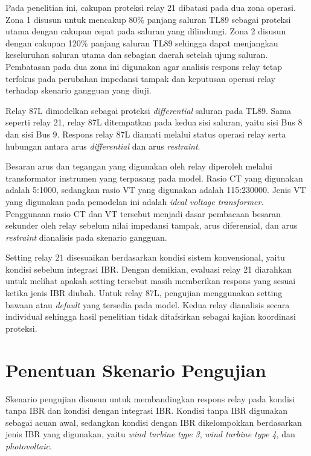Pada penelitian ini, cakupan proteksi relay 21 dibatasi pada dua zona operasi. Zona 1 disusun untuk mencakup 80\% panjang saluran TL89 sebagai proteksi utama dengan cakupan cepat pada saluran yang dilindungi. Zona 2 disusun dengan cakupan 120\% panjang saluran TL89 sehingga dapat menjangkau keseluruhan saluran utama dan sebagian daerah setelah ujung saluran. Pembatasan pada dua zona ini digunakan agar analisis respons relay tetap terfokus pada perubahan impedansi tampak dan keputusan operasi relay terhadap skenario gangguan yang diuji.

Relay 87L dimodelkan sebagai proteksi \textit{differential} saluran pada TL89. Sama seperti relay 21, relay 87L ditempatkan pada kedua sisi saluran, yaitu sisi Bus 8 dan sisi Bus 9. Respons relay 87L diamati melalui status operasi relay serta hubungan antara arus \textit{differential} dan arus \textit{restraint}.

Besaran arus dan tegangan yang digunakan oleh relay diperoleh melalui transformator instrumen yang terpasang pada model. Rasio CT yang digunakan adalah 5:1000, sedangkan rasio VT yang digunakan adalah 115:230000. Jenis VT yang digunakan pada pemodelan ini adalah \textit{ideal voltage transformer}. Penggunaan rasio CT dan VT tersebut menjadi dasar pembacaan besaran sekunder oleh relay sebelum nilai impedansi tampak, arus diferensial, dan arus \textit{restraint} dianalisis pada skenario gangguan.

Setting relay 21 disesuaikan berdasarkan kondisi sistem konvensional, yaitu kondisi sebelum integrasi IBR. Dengan demikian, evaluasi relay 21 diarahkan untuk melihat apakah setting tersebut masih memberikan respons yang sesuai ketika jenis IBR diubah. Untuk relay 87L, pengujian menggunakan setting bawaan atau \textit{default} yang tersedia pada model. Kedua relay dianalisis secara individual sehingga hasil penelitian tidak ditafsirkan sebagai kajian koordinasi proteksi.

\section{Penentuan Skenario Pengujian}

Skenario pengujian disusun untuk membandingkan respons relay pada kondisi tanpa IBR dan kondisi dengan integrasi IBR. Kondisi tanpa IBR digunakan sebagai acuan awal, sedangkan kondisi dengan IBR dikelompokkan berdasarkan jenis IBR yang digunakan, yaitu \textit{wind turbine type 3}, \textit{wind turbine type 4}, dan \textit{photovoltaic}.

